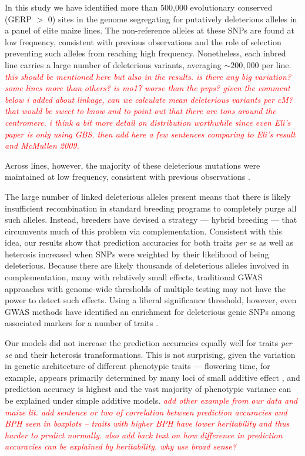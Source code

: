 \documentclass[twoside,twocolumn, letterpaper]{article}
\newcommand{\jri}[1]{\textcolor{red}{ \emph{ #1}} }
\begin{document}
In this study we have identified more than 500,000 evolutionary conserved (GERP $>$ 0) sites in the genome segregating for putatively deleterious alleles in a panel of elite maize lines. 
The non-reference alleles at these SNPs are found at low frequency, consistent with previous observations \citep{Mezmouk2014, rodgers2015recombination} and the role of selection preventing such alleles from reaching high frequency. 
Nonetheless, each inbred line carries a large number of deleterious variants, averaging $\sim 200,000$ per line. 
\jri{this should be mentioned here but also in the results. is there any big variation?  some lines more than others? is mo17 worse than the pvps? given the comment below i added about linkage, can we calculate mean deleterious variants per cM?  that would be sweet to know and to point out that there are tons around the centromere. i think a bit more detail on distribution worthwhile since even Eli's paper is only using GBS. then add here a few sentences comparing to Eli's result and McMullen 2009.}

Across lines, however, the majority of these deleterious mutations were maintained at low frequency, consistent with previous observations \citep{rodgers2015recombination}. 

The large number of linked deleterious alleles present means that there is likely insufficient recombination in standard breeding programs to completely purge all such alleles. 
Instead, breeders have devised a strategy --- hybrid breeding --- that circumvents much of this problem via complementation.
Consistent with this idea, our results show that prediction accuracies for both traits \emph{per se} as well as heterosis increased when SNPs were weighted by their likelihood of being deleterious.
Because there are likely thousands of deleterious alleles involved in complementation, many with relatively small effects, traditional GWAS approaches with genome-wide thresholds of multiple testing may not have the power to detect such effects.
Using a liberal significance threshold, however, even GWAS methods have identified an enrichment for deleterious genic SNPs among associated markers for a number of traits \citep{Mezmouk2014}.


Our models did not increase the prediction accuracies equally well for traits \emph{per se} and their heterosis transformations. 
This is not surprising, given the variation in genetic architecture of different phenotypic traits --- flowering time, for example, appears primarily determined by many loci of small additive effect \citep{buckler2009genetic}, and prediction accuracy is highest and the vast majority of phenotypic variance can be explained under simple additive models.  \jri{add other example from our data and maize lit. add sentence or two of correlation between prediction accuracies and BPH seen in boxplots -- traits with higher BPH have lower heritability and thus harder to predict normally. also add back text on how difference in prediction accuracies can be explained by heritability. why use broad sense? }
\end{document}

